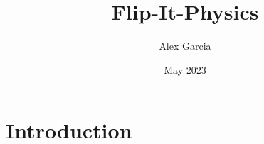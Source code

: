 \documentclass{article}
\title{Flip-It-Physics}
\author{Alex Garcia}
\date{May 2023}
\begin{document}
\maketitle

\section{Introduction}
\end{document}
